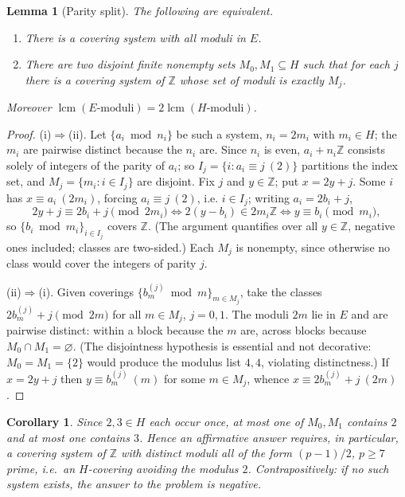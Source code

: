 \documentclass[11pt]{article}
\newtheorem{lemma}[theorem]{Lemma}
\newtheorem{corollary}[theorem]{Corollary}
\theoremstyle{definition}
\begin{document}
\begin{lemma}[Parity split]\label{lem:parity}
The following are equivalent.
\begin{enumerate}
\item[\rm(i)] There is a covering system with all moduli in $E$.
\item[\rm(ii)] There are two \emph{disjoint} finite nonempty sets $M_0,M_1\subseteq H$ such that for
each $j$ there is a covering system of $\mathbb Z$ whose set of moduli is exactly $M_j$.
\end{enumerate}
Moreover $\operatorname{lcm}(E\text{-moduli})=2\operatorname{lcm}(H\text{-moduli})$.
\end{lemma}

\begin{proof}
(i)$\Rightarrow$(ii). Let $\{a_i\bmod n_i\}$ be such a system, $n_i=2m_i$ with $m_i\in H$; the
$m_i$ are pairwise distinct because the $n_i$ are. Since $n_i$ is even, $a_i+n_i\mathbb Z$ consists
solely of integers of the parity of $a_i$; so $I_j=\{i:a_i\equiv j\ (2)\}$ partitions the index
set, and $M_j=\{m_i:i\in I_j\}$ are disjoint. Fix $j$ and $y\in\mathbb Z$; put $x=2y+j$. Some $i$
has $x\equiv a_i\ (2m_i)$, forcing $a_i\equiv j\ (2)$, i.e. $i\in I_j$; writing $a_i=2b_i+j$,
\[
2y+j\equiv 2b_i+j \pmod{2m_i}\iff 2(y-b_i)\in 2m_i\mathbb Z\iff y\equiv b_i\pmod{m_i},
\]
so $\{b_i\bmod m_i\}_{i\in I_j}$ covers $\mathbb Z$. (The argument quantifies over all
$y\in\mathbb Z$, negative ones included; classes are two-sided.) Each $M_j$ is nonempty, since
otherwise no class would cover the integers of parity $j$.

(ii)$\Rightarrow$(i). Given coverings $\{b^{(j)}_m\bmod m\}_{m\in M_j}$, take the classes
$2b^{(j)}_m+j \pmod{2m}$ for all $m\in M_j$, $j=0,1$. The moduli $2m$ lie in $E$ and are pairwise
distinct: within a block because the $m$ are, across blocks because $M_0\cap M_1=\varnothing$.
(The disjointness hypothesis is essential and not decorative: $M_0=M_1=\{2\}$ would produce the
modulus list $4,4$, violating distinctness.) If $x=2y+j$ then $y\equiv b^{(j)}_m\ (m)$ for some
$m\in M_j$, whence $x\equiv 2b^{(j)}_m+j\ (2m)$.
\end{proof}

\begin{corollary}\label{cor:pivot}
Since $2,3\in H$ each occur once, at most one of $M_0,M_1$ contains $2$ and at most one contains
$3$. Hence an affirmative answer requires, in particular, a covering system of $\mathbb Z$ with
distinct moduli all of the form $(p-1)/2$, $p\ge7$ prime, i.e.\ an $H$-covering avoiding the
modulus $2$. Contrapositively: if no such system exists, the answer to the problem is negative.
\end{corollary}
\end{document}
